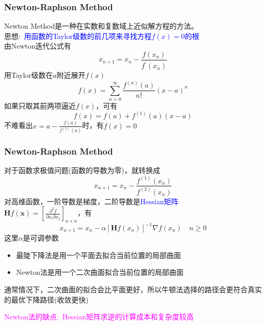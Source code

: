 {\frame
{
	\frametitle{\textrm{Newton-Raphson Method}}
	\textrm{Newton Method}是一种在实数和复数域上近似解方程的方法。\\
	思想:~\textcolor{blue}{用函数的\textrm{Taylor}级数的前几项来寻找方程$f(x)=0$的根}\\
	由\textrm{Newton}迭代公式有
	\begin{displaymath}
		x_{n+1}=x_n-\dfrac{f(x_n)}{f^{\prime}(x_n)}
	\end{displaymath}
	用\textrm{Taylor}级数在$a$附近展开$f(x)$
	\begin{displaymath}
		f(x)=\sum_{n=0}^{\infty}\dfrac{f^{(n)}(a)}{n!}(x-a)^n
	\end{displaymath}
	如果只取其前两项逼近$f(x)$，可有
	\begin{displaymath}
		f(x)=f(a)+f^{(1)}(a)(x-a)
	\end{displaymath}
	不难看出$x=a-\frac{f(a)}{f^{(1)}(a)}$时，有$f(x)=0$
}

\frame
{
	\frametitle{\textrm{Newton-Raphson Method}}
	对于函数求极值问题(函数的导数为零)，就转换成
	\begin{displaymath}
		x_{n+1}=x_{n}-\dfrac{f^{(1)}(x_n)}{f^{(2)}(x_n)}
	\end{displaymath}
	对高维函数，一阶导数是梯度，二阶导数是\textcolor{blue}{\textrm{Hessian}矩阵}\\$\mathbf{H}f(\mathbf{x})=[\frac{\partial^2f}{\partial x_i\partial x_j}]_{n\times n}$，有
	\begin{displaymath}
		x_{n+1}=x_n-\alpha[\mathbf{H}f(x_n)]^{-1}\nabla f(x_n)\quad n\geqslant0
	\end{displaymath}
	这里$\alpha$是可调参数%

	\begin{itemize}
		\item 最陡下降法是用一个平面去拟合当前位置的局部曲面
		\item \textrm{Newton}法是用一个二次曲面拟合当前位置的局部曲面
	\end{itemize}
通常情况下，二次曲面的拟合会比平面更好，所以牛顿法选择的路径会更符合真实的最优下降路径(收敛更快)

\textcolor{magenta}{\textrm{Newton}法的缺点:~\textrm{Hessian}矩阵求逆的计算成本和复杂度较高}
}

}
